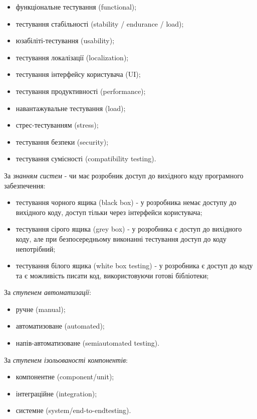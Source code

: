 \begin{itemize}
    \item функціональне тестування (functional);
    \item тестування стабільності (stability / endurance / load);
    \item юзабіліті-тестування (usability);
    \item тестування локалізації (localization);
    \item тестування інтерфейсу користувача (UI);
    \item тестування продуктивності (performance);
    \item навантажувальне тестування (load);
    \item стрес-тестуванням (stress);
    \item тестування безпеки (security);
    \item тестування сумісності (compatibility testing).
\end{itemize}

За \emph{знанням систем} - чи має розробник доступ до вихідного коду програмного забезпечення:

\begin{itemize}
    \item тестування чорного ящика (black box) - у розробника немає доступу до вихідного коду,
      доступ тільки через інтерфейси користувача;
    \item тестування сірого ящика (grey box) - у розробника є доступ до вихідного коду,
      але при безпосередньому виконанні тестування доступ до коду непотрібний;
    \item тестування білого ящика (white box testing) - у розробника є доступ до коду
      та є можливість писати код, використовуючи готові бібліотеки;
\end{itemize}

За \emph{ступенем автоматизації}:

\begin{itemize}
    \item ручне (manual);
    \item автоматизоване (automated);
    \item напів-автоматизоване (semiautomated testing).
\end{itemize}

За \emph{ступенем ізольованості компонентів}:

\begin{itemize}
    \item компонентне (component/unit);
    \item інтеграційне (integration);
    \item системне (system/end-to-endtesting).
\end{itemize}

